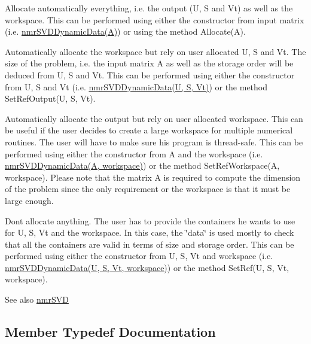 \begin{DoxyItemize}
\item Allocate automatically everything, i.\+e. the output (U, S and Vt) as well as the workspace. This can be performed using either the constructor from input matrix (i.\+e. \hyperlink{classnmr_s_v_d_dynamic_data}{nmr\+S\+V\+D\+Dynamic\+Data(\+A)}) or using the method Allocate(\+A).
\item Automatically allocate the workspace but rely on user allocated U, S and Vt. The size of the problem, i.\+e. the input matrix A as well as the storage order will be deduced from U, S and Vt. This can be performed using either the constructor from U, S and Vt (i.\+e. \hyperlink{classnmr_s_v_d_dynamic_data}{nmr\+S\+V\+D\+Dynamic\+Data(\+U, S, Vt)}) or the method Set\+Ref\+Output(\+U, S, Vt).
\item Automatically allocate the output but rely on user allocated workspace. This can be useful if the user decides to create a large workspace for multiple numerical routines. The user will have to make sure his program is thread-\/safe. This can be performed using either the constructor from A and the workspace (i.\+e. \hyperlink{classnmr_s_v_d_dynamic_data}{nmr\+S\+V\+D\+Dynamic\+Data(\+A, workspace)}) or the method Set\+Ref\+Workspace(\+A, workspace). Please note that the matrix A is required to compute the dimension of the problem since the only requirement or the workspace is that it must be large enough.
\item Don\textquotesingle{}t allocate anything. The user has to provide the containers he wants to use for U, S, Vt and the workspace. In this case, the \char`\"{}data\char`\"{} is used mostly to check that all the containers are valid in terms of size and storage order. This can be performed using either the constructor from U, S, Vt and workspace (i.\+e. \hyperlink{classnmr_s_v_d_dynamic_data}{nmr\+S\+V\+D\+Dynamic\+Data(\+U, S, Vt, workspace)}) or the method Set\+Ref(\+U, S, Vt, workspace).
\end{DoxyItemize}

\begin{DoxySeeAlso}{See also}
\hyperlink{nmr_s_v_d_8h_a52115d0e7a485c4494aa20f4f3f4ebe7}{nmr\+S\+V\+D} 
\end{DoxySeeAlso}


\subsection{Member Typedef Documentation}
\hypertarget{classnmr_s_v_d_dynamic_data_a3673bb17448a97213388b41ce36ef5b0}{}
